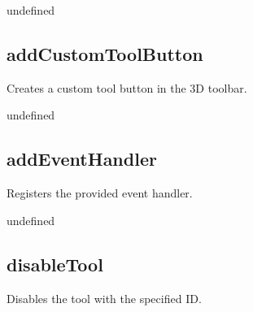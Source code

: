 \documentclass[letterpaper,12pt,english,openany,oneside]{sphinxmanual}
\begin{document}
\label{\detokenize{JS_3D_API:section-87}}\label{\detokenize{JS_3D_API:returns-82}}

undefined


\subsection{addCustomToolButton}
\label{\detokenize{JS_3D_API:addcustomtoolbutton}}
Creates a custom tool button in the 3D toolbar.

\label{\detokenize{JS_3D_API:syntax-82}}

\begin{sphinxVerbatim}[commandchars=\\\{\}]
  
\end{sphinxVerbatim}
\label{\detokenize{JS_3D_API:parameters-60}}

\label{\detokenize{JS_3D_API:section-88}}\label{\detokenize{JS_3D_API:returns-83}}

undefined


\subsection{addEventHandler}
\label{\detokenize{JS_3D_API:addeventhandler}}
Registers the provided event handler.

\label{\detokenize{JS_3D_API:syntax-83}}

\begin{sphinxVerbatim}[commandchars=\\\{\}]
\end{sphinxVerbatim}
\label{\detokenize{JS_3D_API:parameters-61}}

\label{\detokenize{JS_3D_API:section-89}}\label{\detokenize{JS_3D_API:returns-84}}

undefined


\subsection{disableTool}
\label{\detokenize{JS_3D_API:disabletool}}
Disables the tool with the specified ID.
\end{document}
